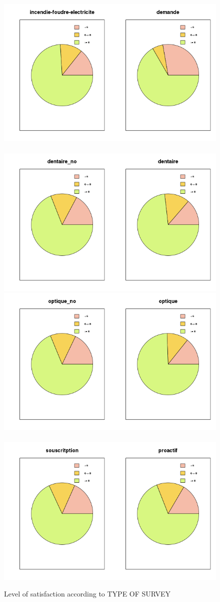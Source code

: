 \documentclass[a4paper, 11pt]{article}
\begin{document}
\begin{figure}[!ht]
            \includegraphics[width = 8.5 cm]{Remi/Level_of_satisfaction_according_to_TYPE_OF_SURVEY10.png}~
            \includegraphics[width = 8.5 cm]{Remi/Level_of_satisfaction_according_to_TYPE_OF_SURVEY12.png}
            \includegraphics[width = 8.5 cm]{Remi/Level_of_satisfaction_according_to_TYPE_OF_SURVEY14.png}~
            \includegraphics[width = 8.5 cm]{Remi/Level_of_satisfaction_according_to_TYPE_OF_SURVEY16.png}
            \caption{Level of satisfaction according to TYPE OF SURVEY}
            \label{fig:TYPE_OF_SURVEY2}
    \end{figure}
\end{document}
